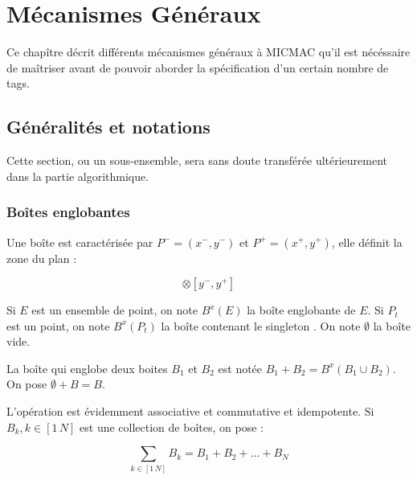\chapter{M\'ecanismes G\'en\'eraux}

Ce chap\^itre d\'ecrit diff\'erents m\'ecanismes g\'en\'eraux \`a
MICMAC qu'il est n\'ec\'essaire de ma\^itriser avant de pouvoir
aborder la sp\'ecification d'un certain nombre de tags.


\section{G\'en\'eralit\'es et notations}

Cette section, ou un sous-ensemble, sera sans doute transf\'er\'ee 
ult\'erieurement dans la partie algorithmique.




\subsection{Bo\^ites englobantes}

Une bo\^ite  est caract\'eris\'ee  par $P^-=(x^-,y^-)$ et 
$P^+=(x^+,y^+)$, elle d\'efinit la zone du plan  :

\begin{equation}
   [x^- , x^+] \otimes [y^- , y^+]
\end{equation}


Si $E$ est un
ensemble de point, on note $B^x(E)$ la bo\^ite englobante
de $E$.  Si $P_t$ est un point,
on note $B^x(P_t)$ la bo\^ite contenant le singleton  .
On note $\emptyset$ la bo\^ite vide. 

La bo\^ite qui englobe deux boites $B_1$ et $B_2$ est not\'ee
 $B_1+B_2 =B^x(B_1 \cup  B_2)$. On pose $\emptyset+B=B$.

L'op\'eration est \'evidemment associative et commutative et
idempotente. Si $B_k,k \in [1\, N]$ est une collection de
bo\^ites, on pose  :

\begin{equation}
     \sum_{k \in [1\, N]}B_k= B_1+B_2+ \dots +B_N
\end{equation}

